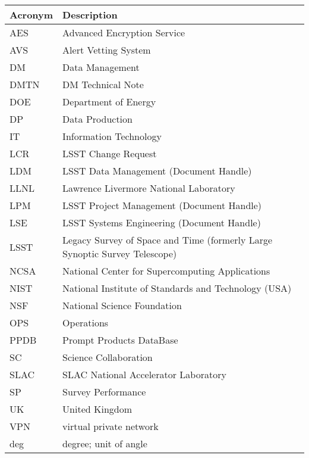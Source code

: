 \addtocounter{table}{-1}
\begin{longtable}{p{}p{}}\hline
\textbf{Acronym} & \textbf{Description}  \\\hline

AES & Advanced Encryption Service \\\hline
AVS &  Alert Vetting System \\\hline
DM & Data Management \\\hline
DMTN & DM Technical Note \\\hline
DOE & Department of Energy \\\hline
DP & Data Production \\\hline
IT & Information Technology \\\hline
LCR & LSST Change Request \\\hline
LDM & LSST Data Management (Document Handle) \\\hline
LLNL & Lawrence Livermore National Laboratory \\\hline
LPM & LSST Project Management (Document Handle) \\\hline
LSE & LSST Systems Engineering (Document Handle) \\\hline
LSST & Legacy Survey of Space and Time (formerly Large Synoptic Survey Telescope) \\\hline
NCSA & National Center for Supercomputing Applications \\\hline
NIST & National Institute of Standards and Technology (USA) \\\hline
NSF & National Science Foundation \\\hline
OPS & Operations \\\hline
PPDB & Prompt Products DataBase \\\hline
SC & Science Collaboration \\\hline
SLAC & SLAC National Accelerator Laboratory \\\hline
SP & Survey Performance \\\hline
UK & United Kingdom \\\hline
VPN & virtual private network \\\hline
deg & degree; unit of angle \\\hline
\end{longtable}
